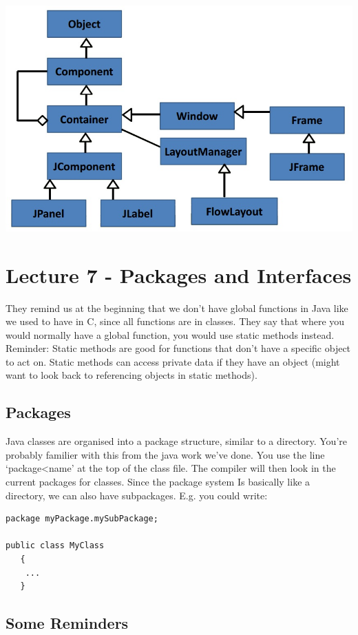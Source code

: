 \documentclass{article}
\begin{document}
\includegraphics[scale=0.5]{standard.jpg}

\section{Lecture 7 - Packages and Interfaces}

They remind us at the beginning that we don't have global functions in Java like we used to have in C,
since all functions are in classes. They say that where you would normally have a global function, you
would use static methods instead. Reminder: Static methods are good for functions that don't have a 
specific object to act on. Static methods can access private data if they have an object (might want 
to look back to referencing objects in static methods).

\subsection{Packages}
Java classes are organised into a package structure, similar to a directory. You're probably familier 
with this from the java work we've done. You use the line `package\textless{name}' at the top of the class file.
The compiler will then look in the current packages for classes. Since the package system Is basically
like a directory, we can also have subpackages. E.g. you could write:

\begin{lstlisting}
package myPackage.mySubPackage;

public class MyClass
   {
	...
   }
\end{lstlisting}

\subsection{Some Reminders}
\end{document}
